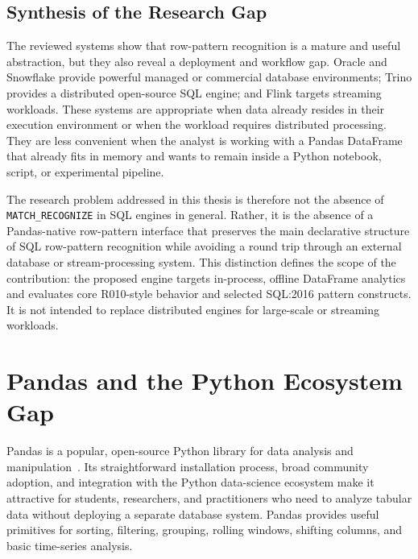 \subsection{Synthesis of the Research Gap}
\label{subsec:related-gap-synthesis}

The reviewed systems show that row-pattern recognition is a mature
and useful abstraction, but they also reveal a deployment and
workflow gap.  Oracle and Snowflake provide powerful managed or
commercial database environments; Trino provides a distributed
open-source SQL engine; and Flink targets streaming workloads.  These
systems are appropriate when data already resides in their execution
environment or when the workload requires distributed processing.
They are less convenient when the analyst is working with a Pandas
DataFrame that already fits in memory and wants to remain inside a
Python notebook, script, or experimental pipeline.

The research problem addressed in this thesis is therefore not the
absence of \texttt{MATCH\_RECOGNIZE} in SQL engines in general.
Rather, it is the absence of a Pandas-native row-pattern interface
that preserves the main declarative structure of SQL row-pattern
recognition while avoiding a round trip through an external database
or stream-processing system.  This distinction defines the scope of
the contribution: the proposed engine targets in-process, offline
DataFrame analytics and evaluates core R010-style behavior and
selected SQL:2016 pattern constructs.  It is not intended to replace
distributed engines for large-scale or streaming workloads.

\section{Pandas and the Python Ecosystem Gap}
\label{sec:related-pandas-gap}

Pandas is a popular, open-source Python library for data analysis
and manipulation~\cite{McKinney2010}.  Its straightforward installation process, broad
community adoption, and integration with the Python data-science
ecosystem make it attractive for students, researchers, and
practitioners who need to analyze tabular data without deploying a
separate database system.  Pandas provides useful primitives for
sorting, filtering, grouping, rolling windows, shifting columns, and
basic time-series analysis.

